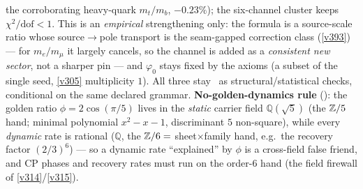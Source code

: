 \begin{winbox}
the corroborating heavy-quark $m_t/m_b$, $-0.23\%$); the six-channel cluster keeps $\chi^2/\mathrm{dof}{<}1$. This is an \emph{empirical} strengthening only: the formula is a source-scale ratio whose source$\to$pole transport is the seam-gapped correction class (\vref{v393}) --- for $m_e/m_\mu$ it largely cancels, so the channel is added as a \emph{consistent new sector}, not a sharper pin --- and $\varphi_0$ stays fixed by the axioms (a subset of the single seed, \vref{v305} multiplicity $1$). All three stay \mE\ as structural/statistical checks, conditional on the same declared grammar.
\textbf{No-golden-dynamics rule} (): the golden ratio $\phi=2\cos(\pi/5)$ lives in the \emph{static} carrier field $\mathbb Q(\sqrt5)$ (the $\mathbb{Z}/5$ hand; minimal polynomial $x^2-x-1$, discriminant $5$ non-square), while every \emph{dynamic} rate is rational ($\mathbb Q$, the $\mathbb{Z}/6=$ sheet$\times$family hand, e.g.\ the recovery factor $(2/3)^6$) --- so a dynamic rate ``explained'' by $\phi$ is a cross-field false friend, and CP phases and recovery rates must run on the order-$6$ hand (the field firewall of \vref{v314}/\vref{v315}).
\end{winbox}

